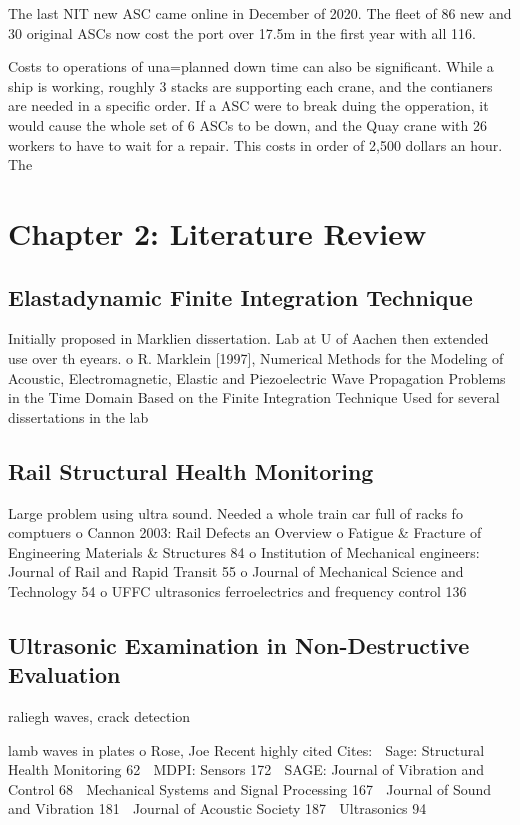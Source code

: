 \documentclass[journal=jacsat,manuscript=article]{achemso}
\begin{document}
The last NIT new ASC came online in December of 2020.  The fleet of 86 new and 30 original ASCs now cost the port over 17.5m in the first year with all 116. 

Costs to operations of una=planned down time can also be significant.  While a ship is working, roughly 3 stacks are supporting each crane, and the contianers are needed in a specific order.  If a ASC were to break duing the opperation, it would cause the whole set of 6 ASCs to be down, and the Quay crane with 26 workers to have to wait for a repair.  This costs in order of 2,500 dollars an hour.  The 

\pagebreak
\section{Chapter 2: Literature Review}
\subsection{Elastadynamic Finite Integration Technique}

Initially proposed in Marklien dissertation.  Lab at U of Aachen then extended use over th eyears.
o	R. Marklein [1997], Numerical Methods for the Modeling of Acoustic, Electromagnetic, Elastic and Piezoelectric Wave Propagation Problems in the Time Domain Based on the Finite Integration Technique
Used for several dissertations in the lab

\subsection{Rail Structural Health Monitoring}
Large problem using ultra sound.  Needed a whole train car full of racks fo comptuers
o	Cannon 2003: Rail Defects an Overview
o	Fatigue & Fracture of Engineering Materials & Structures    84
o	Institution of Mechanical engineers: Journal of Rail and Rapid Transit  55
o	Journal of Mechanical Science and Technology  54
o	UFFC ultrasonics ferroelectrics and frequency control  136

\subsection{Ultrasonic Examination in Non-Destructive Evaluation}
raliegh waves, crack detection

lamb waves in plates
o	Rose, Joe Recent highly cited Cites:
	Sage: Structural Health Monitoring    62
	MDPI: Sensors  172
	SAGE: Journal of Vibration and Control   68
	Mechanical Systems and Signal Processing    167  
	Journal of Sound and Vibration    181
	Journal of Acoustic Society  187
	Ultrasonics  94
\end{document}
